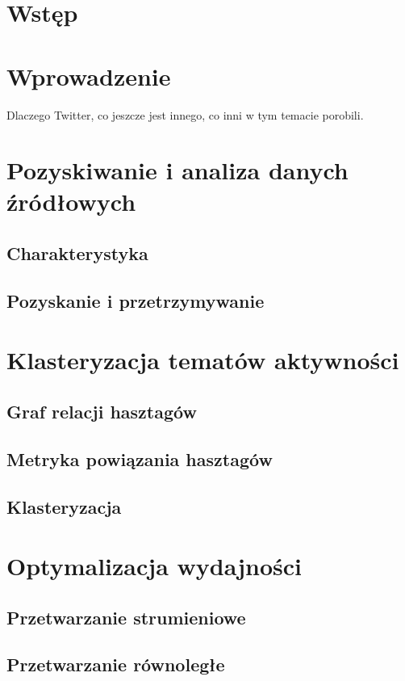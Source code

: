 \chapter{Wstęp}
\label{cha:wstep}

\chapter{Wprowadzenie}
Dlaczego Twitter, co jeszcze jest innego, co inni w tym temacie porobili.

\chapter{Pozyskiwanie i analiza danych źródłowych}
\section{Charakterystyka}
\section{Pozyskanie i przetrzymywanie}

\chapter{Klasteryzacja tematów aktywności}
\section{Graf relacji hasztagów}
\section{Metryka powiązania hasztagów}
\section{Klasteryzacja}

\chapter{Optymalizacja wydajności}
\section{Przetwarzanie strumieniowe}
\section{Przetwarzanie równoległe}

